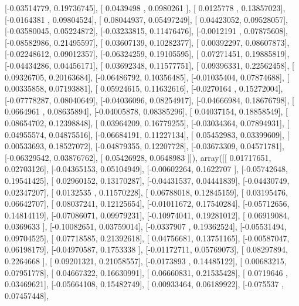 \documentclass{article}
\begin{document}
       [-0.03514779,  0.19736745],
       [ 0.0439498 ,  0.0980261 ],
       [ 0.0125778 ,  0.13857023],
       [-0.0164381 ,  0.09804524],
       [ 0.08044937,  0.05497249],
       [ 0.04423052,  0.09528057],
       [-0.03580045,  0.05224872],
       [-0.03233815,  0.11476476],
       [-0.0012191 ,  0.07875608],
       [-0.08582986,  0.21495597],
       [ 0.03607139,  0.10282377],
       [ 0.00392297,  0.08607873],
       [-0.02248612,  0.09012357],
       [-0.06324259,  0.19105595],
       [ 0.07271451,  0.19885819],
       [-0.04434286,  0.04456171],
       [ 0.03692348,  0.11577751],
       [ 0.09396331,  0.22562458],
       [ 0.09326705,  0.20163684],
       [-0.06486792,  0.10356485],
       [-0.01035404,  0.07874688],
       [ 0.00335858,  0.07193881],
       [ 0.05924615,  0.11632616],
       [-0.0270164 ,  0.15272004],
       [-0.07778287,  0.08040649],
       [-0.04036096,  0.08254917],
       [-0.04666984,  0.18676798],
       [ 0.0664961 ,  0.08635894],
       [-0.04005878,  0.08385296],
       [ 0.04037154,  0.18858549],
       [ 0.08654702,  0.12398848],
       [ 0.03964209,  0.16779255],
       [-0.03034364,  0.07894931],
       [ 0.04955574,  0.04875516],
       [-0.06684191,  0.11227134],
       [ 0.05452983,  0.03399609],
       [ 0.00533693,  0.18527072],
       [-0.04879355,  0.12207728],
       [-0.03673309,  0.04571781],
       [-0.06329542,  0.03876762],
       [ 0.05426928,  0.0648983 ]]), array([[ 0.01717651,  0.02703126],
       [-0.04365153,  0.05104949],
       [-0.00602264,  0.1622707 ],
       [-0.05742648,  0.19541425],
       [ 0.02960152,  0.13170287],
       [-0.04431537,  0.04441839],
       [-0.04430749,  0.02347207],
       [ 0.0132535 ,  0.11570228],
       [ 0.06788018,  0.12845159],
       [ 0.03195476,  0.06642707],
       [ 0.08037241,  0.12125654],
       [-0.01011672,  0.17540284],
       [-0.05712656,  0.14814119],
       [-0.07086071,  0.09979231],
       [-0.10974041,  0.19281012],
       [ 0.06919084,  0.0369633 ],
       [-0.10082651,  0.03759014],
       [-0.0337907 ,  0.19362524],
       [-0.05531494,  0.09704525],
       [ 0.07718585,  0.21392618],
       [ 0.04756681,  0.13751165],
       [-0.00587047,  0.06198179],
       [-0.04970587,  0.1753338 ],
       [-0.01172711,  0.05769073],
       [ 0.08297894,  0.2264668 ],
       [ 0.09201321,  0.21058557],
       [-0.0173893 ,  0.14485122],
       [ 0.00683215,  0.07951778],
       [ 0.04667322,  0.16630991],
       [ 0.06660831,  0.21535428],
       [ 0.0719646 ,  0.03469621],
       [-0.05664108,  0.15482749],
       [ 0.00933464,  0.06189922],
       [-0.075537  ,  0.07457448],
\end{document}
